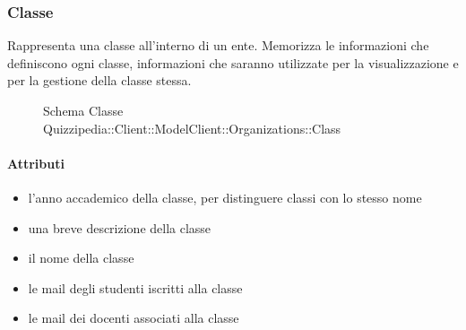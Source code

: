 \subsubsection{Classe }
Rappresenta una classe all'interno di un ente. Memorizza le informazioni che definiscono ogni classe,
informazioni che saranno utilizzate per la visualizzazione e per la gestione della classe stessa.
\begin{figure}[H]
\centering
\noindent{}
\caption[Schema Classe Class]{Schema Classe Quizzipedia::Client::ModelClient::Organizations::Class}
\end{figure}
\paragraph{Attributi}
\begin{itemize}
\item {}
\newline
l'anno accademico della classe, per distinguere classi con lo stesso nome
\item {}
\newline
una breve descrizione della classe
\item {}
\newline
il nome della classe
\item {}
\newline
le mail degli studenti iscritti alla classe
\item {}
\newline
le mail dei docenti associati alla classe
\end{itemize}
